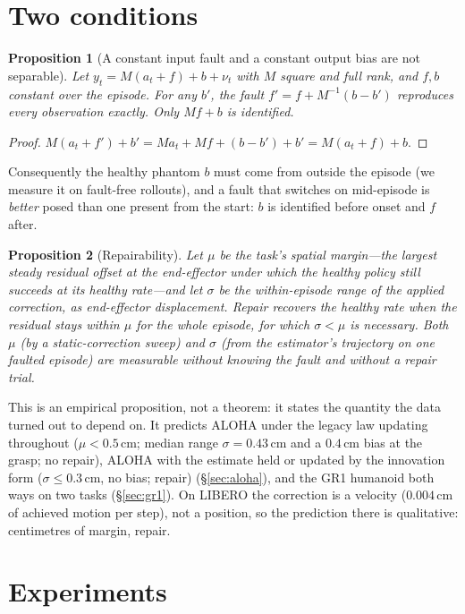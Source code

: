 \documentclass{article}
\newtheorem{proposition}{Proposition}
\begin{document}
\section{Two conditions}
\label{sec:theory}

\begin{proposition}[A constant input fault and a constant output bias are not separable]
\label{prop:sep}
Let $y_t = M(a_t + f) + b + \nu_t$ with $M$ square and full rank, and $f,b$ constant over
the episode. For any $b'$, the fault $f' = f + M^{-1}(b - b')$ reproduces every observation
exactly. Only $Mf + b$ is identified.
\end{proposition}
\begin{proof}
$M(a_t+f') + b' = M a_t + Mf + (b - b') + b' = M(a_t + f) + b$.
\end{proof}
\noindent Consequently the healthy phantom $b$ must come from outside the episode (we measure
it on fault-free rollouts), and a fault that switches on mid-episode is \emph{better} posed
than one present from the start: $b$ is identified before onset and $f$ after.

\begin{proposition}[Repairability]
\label{prop:repair}
Let $\mu$ be the task's spatial margin---the largest steady residual offset at the
end-effector under which the healthy policy still succeeds at its healthy rate---and let
$\sigma$ be the within-episode range of the applied correction, as end-effector displacement. Repair recovers the
healthy rate when the residual stays within $\mu$ for the whole episode, for which
$\sigma < \mu$ is necessary. Both $\mu$ (by a static-correction sweep) and $\sigma$ (from
the estimator's trajectory on one faulted episode) are measurable without knowing the fault
and without a repair trial.
\end{proposition}
\noindent This is an empirical proposition, not a theorem: it states the quantity the data
turned out to depend on. It predicts ALOHA under the legacy law updating throughout ($\mu<0.5$\,cm;
median range $\sigma=0.43$\,cm and a $0.4$\,cm bias at the grasp; no repair), ALOHA with the
estimate held or updated by the innovation form ($\sigma\le0.3$\,cm, no bias; repair)
(\S\ref{sec:aloha}), and the GR1 humanoid both ways on two tasks (\S\ref{sec:gr1}). On LIBERO the
correction is a velocity ($0.004$\,cm of achieved motion per step), not a position, so the
prediction there is qualitative: centimetres of margin, repair.

\section{Experiments}
\label{sec:exp}
\end{document}
